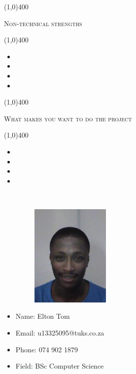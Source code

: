 \documentclass[12pt,a4paper]{report}
\begin{document}
	\begin{center}
	
	\line(1,0){400}\\
	{\scshape\large Non-technical strengths\par}
	\line(1,0){400}\\
	\end{center}
		\begin{itemize}
\item 
\item 
\item 
\item 
\end{itemize}

\begin{center}
	
	\line(1,0){400}\\
	{\scshape\large What makes you want to do the project\par}
	\line(1,0){400}\\
	\end{center}
		\begin{itemize}
\item 
\item 
\item 
\item 
\end{itemize}

\newpage
\vspace*{-3cm}\
\begin{minipage}{0.5\textwidth}
\begin{figure}[H]
\includegraphics[width=5cm,height=5cm,keepaspectratio]{u13325095.jpeg}
\end{figure}
\end{minipage} \hfill
\begin{minipage}{0.6\textwidth}
\begin{itemize}
\item[] Name: Elton Tom
\item[] Email: u13325095@tuks.co.za
\item[] Phone: 074 902 1879
\item[] Field: BSc Computer Science
\end{itemize}
\end{minipage}
\end{document}

